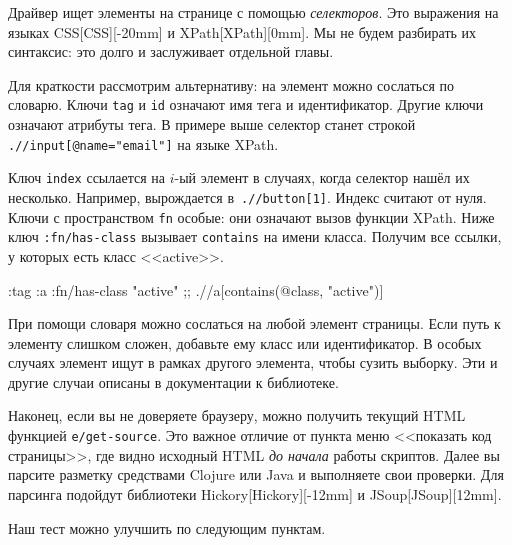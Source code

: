 
Драйвер ищет элементы на странице с помощью \emph{селекторов}. Это выражения на
языках CSS[CSS][-20mm] и
XPath[XPath][0mm]. Мы не
будем разбирать их синтаксис: это долго и заслуживает отдельной главы.

Для краткости рассмотрим альтернативу: на элемент можно сослаться по
словарю. Ключи \verb|tag| и \verb|id| означают имя тега и идентификатор. Другие
ключи означают атрибуты тега. В примере выше селектор
 станет строкой
\verb|.//input[@name="email"]| на языке XPath.


Ключ \verb|index| ссылается на $i$-ый элемент в случаях, когда селектор нашёл их
несколько. Например,  вырождается
в~\verb|.//button[1]|. Индекс считают от нуля. Ключи с пространством \verb|fn|
особые: они означают вызов функции XPath. Ниже ключ \verb|:fn/has-class|
вызывает \verb|contains| на имени класса. Получим все ссылки, у которых есть
класс <<active>>.

\begin{english}
  \begin{clojure}
{:tag :a :fn/has-class "active"}
;; .//a[contains(@class, "active")]
  \end{clojure}
\end{english}

При помощи словаря можно сослаться на любой элемент страницы. Если путь к
элементу слишком сложен, добавьте ему класс или идентификатор. В особых случаях
элемент ищут в рамках другого элемента, чтобы сузить выборку. Эти и другие
случаи описаны в документации к библиотеке.

Наконец, если вы не доверяете браузеру, можно получить текущий HTML функцией
\verb|e/get-source|. Это важное отличие от пункта меню <<показать код
страницы>>, где видно исходный HTML \emph{до начала} работы скриптов. Далее вы
парсите разметку средствами Clojure или Java и выполняете свои проверки. Для
парсинга подойдут библиотеки
Hickory[Hickory][-12mm] и
JSoup[JSoup][12mm].


Наш тест можно улучшить по следующим пунктам.

